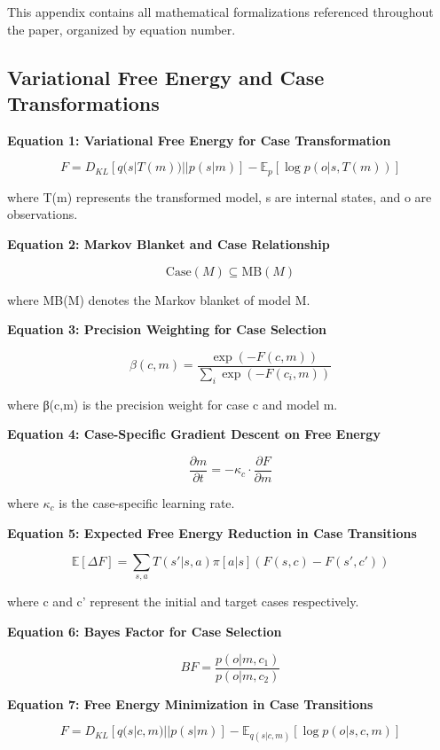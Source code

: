 This appendix contains all mathematical formalizations referenced
throughout the paper, organized by equation number.

\hypertarget{variational-free-energy-and-case-transformations}{%
\subsection{Variational Free Energy and Case
Transformations}\label{variational-free-energy-and-case-transformations}}

\textbf{Equation 1: Variational Free Energy for Case Transformation}

\[
F = D_{KL}[q(s|T(m))||p(s|m)] - \mathbb{E}_{p}[\log p(o|s,T(m))]  \tag{1}
\]

where T(m) represents the transformed model, s are internal states, and
o are observations.

\textbf{Equation 2: Markov Blanket and Case Relationship}

\[\text{Case}(M) \subseteq \text{MB}(M)  \tag{2}\]

where MB(M) denotes the Markov blanket of model M.

\textbf{Equation 3: Precision Weighting for Case Selection}

\[\beta(c,m) = \frac{\exp(-F(c,m))}{\sum_{i}\exp(-F(c_i,m))}  \tag{3}\]

where β(c,m) is the precision weight for case c and model m.

\textbf{Equation 4: Case-Specific Gradient Descent on Free Energy}

\[\frac{\partial m}{\partial t} = -\kappa_c \cdot \frac{\partial F}{\partial m}  \tag{4}\]

where \(\kappa_c\) is the case-specific learning rate.

\textbf{Equation 5: Expected Free Energy Reduction in Case Transitions}

\[
\mathbb{E}[\Delta F] = \sum_{s,a}T(s'|s,a)\pi[a|s](F(s,c)-F(s',c'))  \tag{5}
\]

where c and c' represent the initial and target cases respectively.

\textbf{Equation 6: Bayes Factor for Case Selection}

\[BF = \frac{p(o|m,c_1)}{p(o|m,c_2)}  \tag{6}\]

\textbf{Equation 7: Free Energy Minimization in Case Transitions}

\[
F = D_{KL}[q(s|c,m) || p(s|m)] - \mathbb{E}_{q(s|c,m)}[\log p(o|s,c,m)]  \tag{7}
\]

